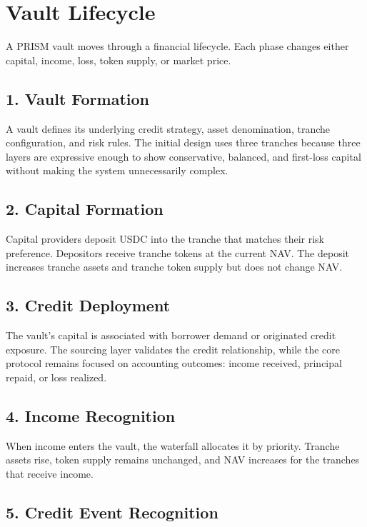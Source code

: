 \documentclass[11pt]{article}
\begin{document}
\section{Vault Lifecycle}

A PRISM vault moves through a financial lifecycle. Each phase changes either
capital, income, loss, token supply, or market price.

\subsection{1. Vault Formation}

A vault defines its underlying credit strategy, asset denomination, tranche
configuration, and risk rules. The initial design uses three tranches because
three layers are expressive enough to show conservative, balanced, and first-loss
capital without making the system unnecessarily complex.

\subsection{2. Capital Formation}

Capital providers deposit USDC into the tranche that matches their risk
preference. Depositors receive tranche tokens at the current NAV. The deposit
increases tranche assets and tranche token supply but does not change NAV.

\subsection{3. Credit Deployment}

The vault's capital is associated with borrower demand or originated credit
exposure. The sourcing layer validates the credit relationship, while the core
protocol remains focused on accounting outcomes: income received, principal
repaid, or loss realized.

\subsection{4. Income Recognition}

When income enters the vault, the waterfall allocates it by priority. Tranche
assets rise, token supply remains unchanged, and NAV increases for the tranches
that receive income.

\subsection{5. Credit Event Recognition}
\end{document}
